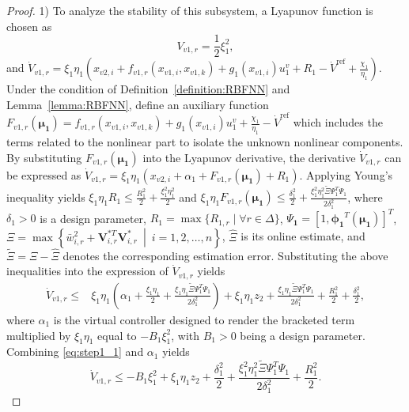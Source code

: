\documentclass[]{interact}
\theoremstyle{plain}%
\theoremstyle{definition}
\theoremstyle{remark}
\begin{document}
\begin{proof}
1) To analyze the stability of this subsystem,  a Lyapunov function \citep{Zg2025,Fs2025} is chosen as 
\begin{equation}
V_{v1,r} = \frac{1}{2}\xi_1^2,
\end{equation}
and $\dot{V}_{v1,r} =  \xi_1 \eta_1 ( x_{v2,i} + f_{v1,r}(x_{v1,i}, x_{v1,k}) + g_1(x_{v1,i}) u_1^v + R_1 - \dot{V}^{\text{ref}} + \frac{\chi_1}{\eta_1} )$. Under the condition of Definition~\ref{definition:RBFNN} and Lemma~\ref{lemma:RBFNN}, define an auxiliary function $F_{v1,r}(\boldsymbol{\mu_1}) = f_{v1,r}(x_{v1,i},x_{v1,k}) + g_1(x_{v1,i})u_1^v + \frac{\chi_1}{\eta_1} - \dot{V}^{\text{ref}}$ which includes the terms related to the nonlinear part to isolate the unknown nonlinear components. By substituting $F_{v1,r}(\boldsymbol{\mu_1})$ into the Lyapunov derivative, the derivative $\dot{V}_{v1,r}$ can be expressed as $ \dot{V}_{v1,r}=\xi_1 \eta_1 \left(
    x_{v2,i} + \alpha_1 + F_{v1,r}(\boldsymbol{\mu_1}) + R_1
\right)$. Applying Young's inequality yields $\xi_1 \eta_1 R_1 \le \frac{R_1^2}{2} + \frac{\xi_1^2 \eta_1^2}{2}$ and
$\xi_1 \eta_1 F_{v1,r}(\boldsymbol{\mu_1})
\le \frac{\delta_1^2}{2}
+ \frac{\xi_1^2 \eta_1^2 \tilde{\Xi} \boldsymbol{\varPsi}_1^T \boldsymbol{\varPsi}_1}{2\delta_1^2}$, where $\delta_1>0$ is a design parameter, $R_1 = \max\{ R_{1,r} \mid \forall r \in \Delta \}$, $\boldsymbol{\varPsi_1}=[1,\boldsymbol{\phi_1}^T(\boldsymbol{\mu_1})]^T$, $\Xi = \max\left\{ \bar{w}_{i,r}^{2} + \boldsymbol{V}_{i,r}^{*T} \boldsymbol{V}_{i,r}^{*}
\ \middle|\ i = 1,2,\ldots,n \right\}$, $\hat{\Xi}$ is its online 
estimate, and $\tilde{\Xi} = \Xi - \hat{\Xi}$ denotes the corresponding estimation error. Substituting the above inequalities into the expression of $\dot{V}_{v1,r}$ yields
\begin{equation}
\begin{aligned}
\label{eq:step1_1}
\dot{V}_{v1,r}
\le {} & \xi_1 \eta_1
\left(
\alpha_1 + \frac{\xi_1 \eta_1}{2} + \frac{\xi_1 \eta_1 \tilde{\Xi} \boldsymbol{\varPsi}_1^{T} \boldsymbol{\varPsi}_1}{2\delta_1^{2}}
\right)  + \xi_1 \eta_1 z_2
+ \frac{\xi_1 \eta_1 \tilde{\Xi} \boldsymbol{\varPsi}_1^{T} \boldsymbol{\varPsi}_1}{2\delta_1^{2}} + \frac{R_1^{2}}{2} + \frac{\delta_1^{2}}{2},
\end{aligned}
\end{equation}
where $\alpha_1$ is the virtual controller designed to render the bracketed term multiplied by $\xi_1 \eta_1$ equal to $-B_1 \xi_1^{2}$, with $B_1>0$ being a design parameter. Combining \eqref{eq:step1_1} and $\alpha_1$ yields
\begin{equation}
\dot{V}_{v1,r}
\le -B_1\xi_1^2
    + \xi_1\eta_1 z_2
    + \frac{\delta_1^2}{2}
    + \frac{\xi_1^2 \eta_1^2 \tilde{\Xi} \boldsymbol{\varPsi}_1^T\boldsymbol{\varPsi}_1}{2\delta_1^2}
    + \frac{R_1^2}{2}.
\end{equation}


\end{proof}
\end{document}
